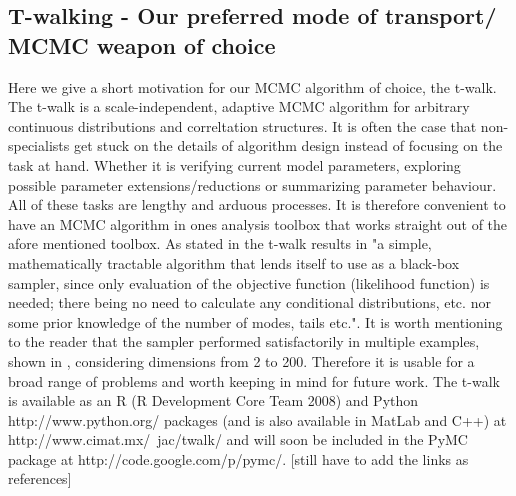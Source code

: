 \documentclass[paper=a4, fontsize=11pt]{scrartcl}
\numberwithin{equation}{section}		%
\numberwithin{figure}{section}			%
\numberwithin{table}{section}				%
\begin{document}
\subsection{T-walking - Our preferred mode of transport/ MCMC weapon of choice}
Here we give a short motivation for our MCMC algorithm of choice, the t-walk. The t-walk is a scale-independent, adaptive MCMC algorithm for arbitrary continuous distributions and correltation structures. 
It is often the case that non-specialists get stuck on the details of algorithm design instead of focusing on the task at hand. Whether it is verifying current model parameters, exploring possible parameter extensions/reductions or summarizing parameter behaviour. All of these tasks are lengthy and arduous processes. It is therefore convenient to have an MCMC algorithm in ones analysis toolbox that works straight out of the afore mentioned toolbox. As stated in \cite{Christen2010AT-walk} the t-walk results in "a simple, mathematically tractable algorithm that lends itself to use as a black-box sampler, since only evaluation of the objective function (likelihood function) is needed; there being no need to calculate any conditional distributions, etc. nor some prior knowledge of the number of modes, tails etc.". 
It is worth mentioning to the reader that the sampler performed satisfactorily in multiple examples, shown in \cite{Christen2010AT-walk}, considering dimensions from 2 to 200. Therefore it is usable for a broad range of problems and worth keeping in mind for future work.
The t-walk is available as an R (R Development Core Team 2008) and Python http://www.python.org/ packages (and is also available in MatLab and C++) at http://www.cimat.mx/~jac/twalk/ and will soon be included in the PyMC package at http://code.google.com/p/pymc/. [still have to add the links as references]
\end{document}
